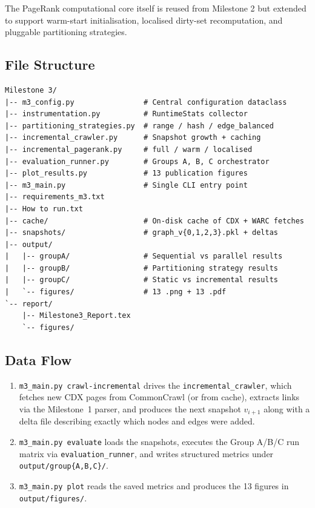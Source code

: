 \documentclass[11pt,a4paper]{article}
\begin{document}
The PageRank computational core itself is reused from Milestone 2 but
extended to support warm-start initialisation, localised dirty-set
recomputation, and pluggable partitioning strategies.

\subsection{File Structure}
\begin{lstlisting}[caption=Milestone 3 directory layout (relative to repo root),numbers=none]
Milestone 3/
|-- m3_config.py                # Central configuration dataclass
|-- instrumentation.py          # RuntimeStats collector
|-- partitioning_strategies.py  # range / hash / edge_balanced
|-- incremental_crawler.py      # Snapshot growth + caching
|-- incremental_pagerank.py     # full / warm / localised
|-- evaluation_runner.py        # Groups A, B, C orchestrator
|-- plot_results.py             # 13 publication figures
|-- m3_main.py                  # Single CLI entry point
|-- requirements_m3.txt
|-- How to run.txt
|-- cache/                      # On-disk cache of CDX + WARC fetches
|-- snapshots/                  # graph_v{0,1,2,3}.pkl + deltas
|-- output/
|   |-- groupA/                 # Sequential vs parallel results
|   |-- groupB/                 # Partitioning strategy results
|   |-- groupC/                 # Static vs incremental results
|   `-- figures/                # 13 .png + 13 .pdf
`-- report/
    |-- Milestone3_Report.tex
    `-- figures/
\end{lstlisting}

\subsection{Data Flow}
\begin{enumerate}
    \item \texttt{m3\_main.py crawl-incremental} drives the
    \texttt{incremental\_crawler}, which fetches new CDX pages from
    CommonCrawl (or from cache), extracts links via the Milestone~1
    parser, and produces the next snapshot $v_{i+1}$ along with a delta
    file describing exactly which nodes and edges were added.
    \item \texttt{m3\_main.py evaluate} loads the snapshots, executes the
    Group A/B/C run matrix via \texttt{evaluation\_runner}, and writes
    structured metrics under \texttt{output/group\{A,B,C\}/}.
    \item \texttt{m3\_main.py plot} reads the saved metrics and produces
    the 13 figures in \texttt{output/figures/}.
\end{enumerate}
\end{document}
